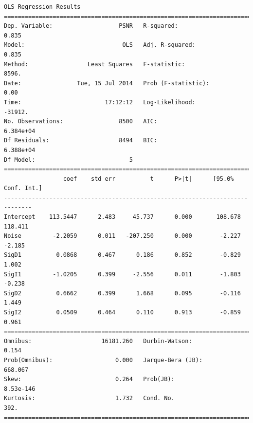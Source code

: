 \documentclass[11pt]{article}
\theoremstyle{definition}
\begin{document}
{\begin{lstlisting}[caption = Time Series 2 - Bilateral Filter 2 Different Iterations OLS Model, label = {2diffbilateral2}]
                            OLS Regression Results                            
==============================================================================
Dep. Variable:                   PSNR   R-squared:                       0.835
Model:                            OLS   Adj. R-squared:                  0.835
Method:                 Least Squares   F-statistic:                     8596.
Date:                Tue, 15 Jul 2014   Prob (F-statistic):               0.00
Time:                        17:12:12   Log-Likelihood:                -31912.
No. Observations:                8500   AIC:                         6.384e+04
Df Residuals:                    8494   BIC:                         6.388e+04
Df Model:                           5                                         
==============================================================================
                 coef    std err          t      P>|t|      [95.0% Conf. Int.]
------------------------------------------------------------------------------
Intercept    113.5447      2.483     45.737      0.000       108.678   118.411
Noise         -2.2059      0.011   -207.250      0.000        -2.227    -2.185
SigD1          0.0868      0.467      0.186      0.852        -0.829     1.002
SigI1         -1.0205      0.399     -2.556      0.011        -1.803    -0.238
SigD2          0.6662      0.399      1.668      0.095        -0.116     1.449
SigI2          0.0509      0.464      0.110      0.913        -0.859     0.961
==============================================================================
Omnibus:                    16181.260   Durbin-Watson:                   0.154
Prob(Omnibus):                  0.000   Jarque-Bera (JB):              668.067
Skew:                           0.264   Prob(JB):                    8.53e-146
Kurtosis:                       1.732   Cond. No.                         392.
==============================================================================
\end{lstlisting}

}
\end{document}

